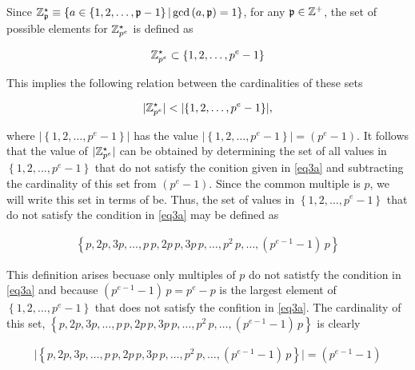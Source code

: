 \documentclass[../CryptoFinal.tex]{subfiles}
\begin{document}
\begin{flushleft}



  Since $\mathbb{Z}_\mathfrak{p}^\star \equiv \left\{ a \in \left\{ 1, 2, \dots, \mathfrak{p}-1 \right\} \vert \gcd \left(a, \mathfrak{p}\right) = 1 \right\}$, for any $\mathfrak{p} \in \mathbb{Z}^+$, the set of possible elements for $\mathbb{Z}_{p^e}^\star$ is defined as

\begin{align}
  \mathbb{Z}_{p^e}^\star \subset \left\{ 1, 2, \dots, p^e - 1 \right\} \label{eq3a}
\end{align}

This implies the following relation between the cardinalities of these sets

\begin{align*}
  \lvert \mathbb{Z}_{p^e}^\star \rvert < \lvert \left\{ 1, 2, \dots, p^e - 1 \right\} \rvert,
\end{align*}

where $\lvert \left\{ 1, 2, \dots, p^e - 1 \right\} \rvert$ has the value $\lvert \left\{ 1, 2, \dots, p^e - 1 \right\} \rvert = \left(p^e - 1\right)$.  It follows that the value of $\lvert \mathbb{Z}_{p^e}^\star \rvert$ can be obtained by determining the set of all values in $\left\{ 1, 2, \dots, p^e - 1 \right\}$ that do not satisfy the conition given in \ref{eq3a} and subtracting the cardinality of this set from $\left( p^e - 1 \right)$.  Since the common multiple is $p$, we will write this set in terms of be.  Thus, the set of values in $\left\{ 1, 2, \dots, p^e - 1 \right\}$ that do not satisfy the condition in \ref{eq3a} may be defined as 

\begin{align*}
  \left\{ p, 2p, 3p, \dots, p \, p, 2 p \, p, 3 p \, p, \dots, p^2 \, p, \dots, \left(p^{e-1} - 1\right) \, p \right\}
\end{align*}

This definition arises becuase only multiples of $p$ do not satistfy the condition in \ref{eq3a} and because $\left(p^{e-1} - 1\right) \, p = p^e - p$ is the largest element of $\left\{ 1, 2, \dots, p^e - 1 \right\}$ that does not satisfy the confition in \ref{eq3a}.  The cardinality of this set, $\left\{ p, 2p, 3p, \dots, p \, p, 2 p \, p, 3 p \, p, \dots, p^2 \, p, \dots, \left(p^{e-1} - 1\right) \, p \right\}$ is clearly

\begin{align*}
  \lvert \left\{ p, 2p, 3p, \dots, p \, p, 2 p \, p, 3 p \, p, \dots, p^2 \, p, \dots, \left(p^{e-1} - 1\right) \, p \right\} \rvert = \left(p^{e-1} - 1\right)
\end{align*}


\end{flushleft}
\end{document}
